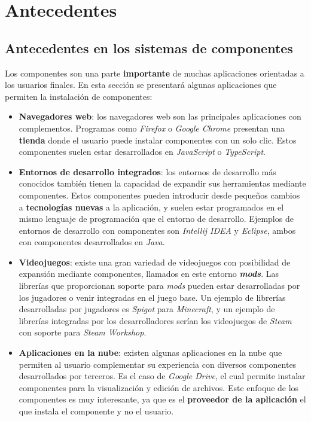 \chapter{Antecedentes}\label{ch:antecedentes}

\section{Antecedentes en los sistemas de componentes}
\label{sec:antecedentes-en-los-sistemas-de-componentes}

Los componentes son una parte \textbf{importante} de muchas aplicaciones
orientadas a los usuarios finales.
En esta sección se presentará algunas aplicaciones que permiten
la instalación de componentes:

\begin{itemize}
    \item \textbf{Navegadores web}: los navegadores web
    son las principales aplicaciones con complementos.
    Programas como \textit{Firefox}\cite{FIREFOX} o
    \textit{Google Chrome}\cite{CHROME}
    presentan una \textbf{tienda} donde el usuario puede instalar
    componentes con un solo clic.
    Estos componentes suelen estar desarrollados en \textit{JavaScript}
    o \textit{TypeScript}.
    \item \textbf{Entornos de desarrollo integrados}: los entornos de
    desarrollo más conocidos también tienen la capacidad de expandir
    sus herramientas mediante componentes.
    Estos componentes pueden introducir desde pequeños cambios
    a \textbf{tecnologías nuevas} a la aplicación, y suelen
    estar programados en el mismo lenguaje de programación
    que el entorno de desarrollo.
    Ejemplos de entornos de desarrollo con componentes
    son \textit{Intellij IDEA}\cite{INTELLIJIDEA} y \textit{Eclipse}\cite{ECLIPSE},
    ambos con componentes desarrollados en \textit{Java}\cite{JAVA}.
    \item \textbf{Videojuegos}: existe una gran variedad
    de videojuegos con posibilidad de expansión mediante
    componentes, llamados en este entorno \textit{\textbf{mods}}.
    Las librerías que proporcionan soporte para \textit{mods}
    pueden estar desarrolladas por los jugadores o venir
    integradas en el juego base.
    Un ejemplo de librerías desarrolladas por jugadores es
    \textit{Spigot}\cite{SPIGOT} para \textit{Minecraft}, y un ejemplo
    de librerías integradas por los desarrolladores
    serían los videojuegos de \textit{Steam} con soporte
    para \textit{Steam Workshop}\cite{STEAM_WORKSHOP}.
    \item \textbf{Aplicaciones en la nube}: existen
    algunas aplicaciones en la nube que permiten
    al usuario complementar su experiencia con diversos
    componentes desarrollados por terceros.
    Es el caso de \textit{Google Drive}, el cual permite
    instalar componentes para la visualización y
    edición de archivos.
    Este enfoque de los componentes es muy interesante,
    ya que es el \textbf{proveedor de la aplicación} el que
    instala el componente y no el usuario.
\end{itemize}


